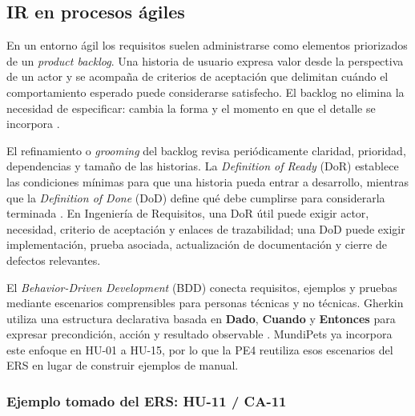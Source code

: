 \documentclass[journal,onecolumn]{IEEEtran}
\begin{document}
	\subsection{IR en procesos ágiles}
	
	En un entorno ágil los requisitos suelen administrarse como elementos priorizados de un
	\emph{product backlog}. Una historia de usuario expresa valor desde la perspectiva de un actor y
	se acompaña de criterios de aceptación que delimitan cuándo el comportamiento esperado puede
	considerarse satisfecho. El backlog no elimina la necesidad de especificar: cambia la forma y el
	momento en que el detalle se incorpora \cite{cohn2004}.
	
	El refinamiento o \emph{grooming} del backlog revisa periódicamente claridad, prioridad,
	dependencias y tamaño de las historias. La \emph{Definition of Ready} (DoR) establece las
	condiciones mínimas para que una historia pueda entrar a desarrollo, mientras que la
	\emph{Definition of Done} (DoD) define qué debe cumplirse para considerarla terminada
	\cite{cohn2004}. En Ingeniería de Requisitos, una DoR útil puede exigir actor, necesidad, criterio
	de aceptación y enlaces de trazabilidad; una DoD puede exigir implementación, prueba asociada,
	actualización de documentación y cierre de defectos relevantes.
	
	El \emph{Behavior-Driven Development} (BDD) conecta requisitos, ejemplos y pruebas mediante
	escenarios comprensibles para personas técnicas y no técnicas. Gherkin utiliza una estructura
	declarativa basada en \textbf{Dado}, \textbf{Cuando} y \textbf{Entonces} para expresar
	precondición, acción y resultado observable \cite{smart2014}. MundiPets ya incorpora este enfoque
	en HU-01 a HU-15, por lo que la PE4 reutiliza esos escenarios del ERS en lugar de construir
	ejemplos de manual.
	
	\subsubsection{Ejemplo tomado del ERS: HU-11 / CA-11}
	
\end{document}
